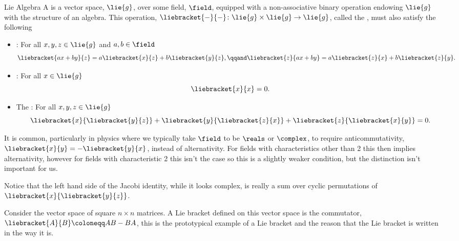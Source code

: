 \begin{dfn}{Lie Algebra}{}
    A  is a vector space, \(\lie{g}\), over some field, \(\field\), equipped with a non-associative binary operation endowing \(\lie{g}\) with the structure of an algebra.
    This operation, \(\liebracket{-}{-} \colon \lie{g}\times\lie{g} \to \lie{g}\), called the , must also satisfy the following
    \begin{itemize}
        \item {}: For all \(x, y, z \in \lie{g}\) and \(a, b \in \field\)
        \begin{equation}
            \liebracket{ax + by}{z} = a\liebracket{x}{z} + b\liebracket{y}{z}, \qqand \liebracket{z}{ax + by} = a\liebracket{z}{x} + b\liebracket{z}{y}.
        \end{equation}
        \item {}: For all \(x \in \lie{g}\)
        \begin{equation}
            \liebracket{x}{x} = 0.
        \end{equation}
        \item The : For all \(x, y, z \in \lie{g}\)
        \begin{equation}
            \liebracket{x}{\liebracket{y}{z}} + \liebracket{y}{\liebracket{z}{x}} + \liebracket{z}{\liebracket{x}{y}} = 0.
        \end{equation}
    \end{itemize}
\end{dfn}
It is common, particularly in physics where we typically take \(\field\) to be \(\reals\) or \(\complex\), to require anticommutativity, \(\liebracket{x}{y} = -\liebracket{y}{x}\), instead of alternativity.
For fields with characteristics other than 2 this then implies alternativity, however for fields with characteristic 2 this isn't the case so this is a slightly weaker condition, but the distinction isn't important for us.

Notice that the left hand side of the Jacobi identity, while it looks complex, is really a sum over cyclic permutations of \(\liebracket{x}{\liebracket{y}{z}}\).

Consider the vector space of square \(n\times n\) matrices.
A Lie bracket defined on this vector space is the commutator, \(\liebracket{A}{B} \coloneqq AB - BA\), this is the prototypical example of a Lie bracket and the reason that the Lie bracket is written in the way it is.

